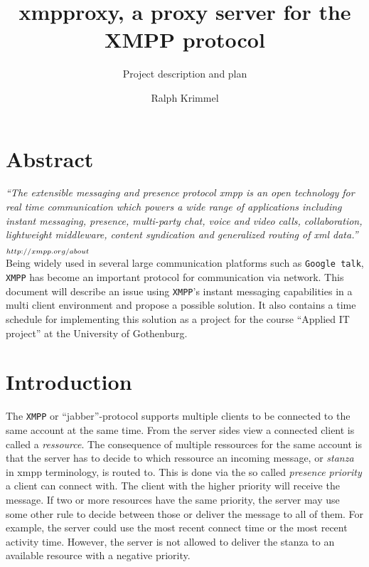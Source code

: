 \documentclass[a4paper,10pt,numbers=noendperiod]{scrartcl}
\author{Ralph Krimmel}
\title{xmpproxy, a proxy server for the XMPP protocol}
\subtitle{ Project description and plan }
\begin{document}
\maketitle{}
\thispagestyle{empty}
\newpage
\tableofcontents{}
\newpage

\section{Abstract}
\textit{``The extensible messaging and presence protocol xmpp is an open technology 
for real time communication which powers a wide range of applications including instant messaging, 
presence, multi-party chat, voice and video calls, collaboration, lightweight middleware, 
content syndication and generalized routing of xml data.''}   $_{\tiny http://xmpp.org/about}$ \\

Being widely used in several large communication platforms such as \texttt{Google talk},  %
\texttt{XMPP} has become an important protocol for communication via network. This document will describe an 
issue using \texttt{XMPP}'s instant messaging capabilities in a multi client environment and propose a possible solution.
It also contains a time schedule for implementing this solution as a project for the course ``Applied IT project'' at the University 
of Gothenburg.

\section{Introduction}
The \texttt{XMPP} or ``jabber''-protocol supports multiple clients to be connected to the same account at the same time. From the server sides view a connected client is called a \textit{ressource}. The consequence of multiple ressources for the same account is that the server has to decide to which ressource an incoming message, or \textit{stanza} in xmpp terminology, is routed to. This is done via the so called \textit{presence priority} a client can connect with.  The client with the higher priority will receive the message. 
If two or more resources have the same priority, the server may use some other rule to decide between those or deliver the message to all of them. For example, the server could use the most recent connect time or the most recent activity time. However, the server is not allowed to deliver the stanza to an available resource with a negative priority. %
\end{document}
